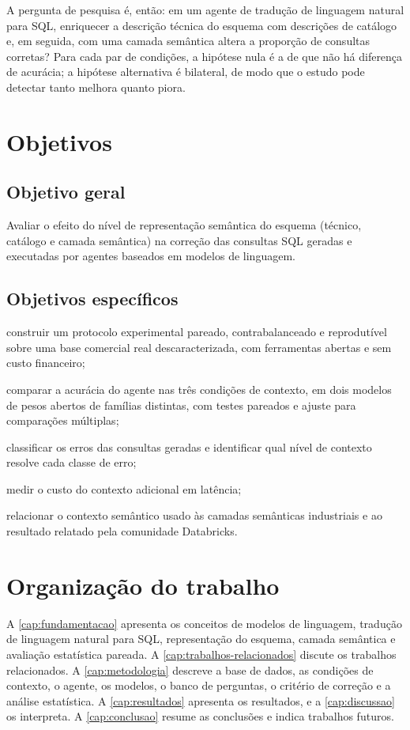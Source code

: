 A pergunta de pesquisa é, então: em um agente de tradução de linguagem
natural para SQL, enriquecer a descrição técnica do esquema com
descrições de catálogo e, em seguida, com uma camada semântica altera a
proporção de consultas corretas? Para cada par de condições, a hipótese
nula é a de que não há diferença de acurácia; a hipótese alternativa é
bilateral, de modo que o estudo pode detectar tanto melhora quanto piora.

\section{Objetivos}
\label{sec:objetivos}

\subsection{Objetivo geral}

Avaliar o efeito do nível de representação semântica do esquema (técnico,
catálogo e camada semântica) na correção das consultas SQL geradas e
executadas por agentes baseados em modelos de linguagem.

\subsection{Objetivos específicos}

\begin{alineas}
  \item construir um protocolo experimental pareado, contrabalanceado e
        reprodutível sobre uma base comercial real descaracterizada, com
        ferramentas abertas e sem custo financeiro;
  \item comparar a acurácia do agente nas três condições de contexto, em
        dois modelos de pesos abertos de famílias distintas, com testes
        pareados e ajuste para comparações múltiplas;
  \item classificar os erros das consultas geradas e identificar qual
        nível de contexto resolve cada classe de erro;
  \item medir o custo do contexto adicional em latência;
  \item relacionar o contexto semântico usado às camadas semânticas
        industriais e ao resultado relatado pela comunidade Databricks.
\end{alineas}

\section{Organização do trabalho}
\label{sec:organizacao}

A \autoref{cap:fundamentacao} apresenta os conceitos de modelos de
linguagem, tradução de linguagem natural para SQL, representação do
esquema, camada semântica e avaliação estatística pareada. A
\autoref{cap:trabalhos-relacionados} discute os trabalhos relacionados. A
\autoref{cap:metodologia} descreve a base de dados, as condições de
contexto, o agente, os modelos, o banco de perguntas, o critério de
correção e a análise estatística. A \autoref{cap:resultados} apresenta os
resultados, e a \autoref{cap:discussao} os interpreta. A
\autoref{cap:conclusao} resume as conclusões e indica trabalhos futuros.
